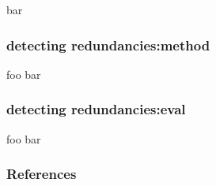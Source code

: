 \documentclass[table]{beamer}
\begin{document}
\begin{frame}
bar
\end{frame}

\begin{frame}
  \frametitle{detecting redundancies:method}
  foo bar
\end{frame}

\begin{frame}
  \frametitle{detecting redundancies:eval}
  foo bar
\end{frame}

\begin{frame}
  \frametitle{References}
  
  
\end{frame}
\end{document}

